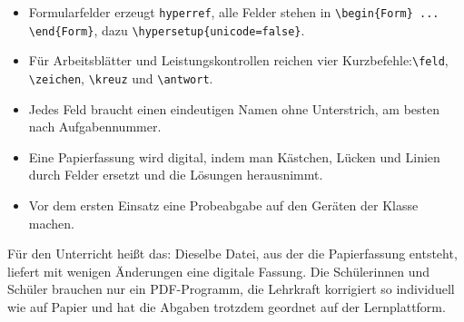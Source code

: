 \begin{Form}
\begin{itemize}
	\item Formularfelder erzeugt \texttt{hyperref}, alle Felder stehen in
	\verb|\begin{Form} ... \end{Form}|, dazu \verb|\hypersetup{unicode=false}|.
	\item Für Arbeitsblätter und Leistungskontrollen reichen vier
	Kurzbefehle:\newline \verb|\feld|, \verb|\zeichen|, \verb|\kreuz| und
	\verb|\antwort|.
	\item Jedes Feld braucht einen eindeutigen Namen ohne Unterstrich, am
	besten nach Aufgabennummer.
	\item Eine Papierfassung wird digital, indem man Kästchen, Lücken und
	Linien durch Felder ersetzt und die Lösungen herausnimmt.
	\item Vor dem ersten Einsatz eine Probeabgabe auf den Geräten der Klasse
	machen.
\end{itemize}

Für den Unterricht heißt das: Dieselbe Datei, aus der die Papierfassung
entsteht, liefert mit wenigen Änderungen eine digitale Fassung. Die
Schülerinnen und Schüler brauchen nur ein PDF-Programm, die Lehrkraft
korrigiert so individuell wie auf Papier und hat die Abgaben trotzdem
geordnet auf der Lernplattform.

\end{Form}

